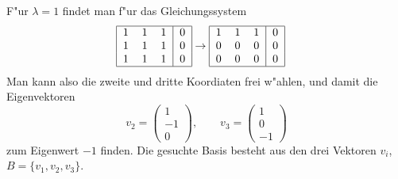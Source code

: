 \begin{loesung}
F"ur $\lambda=1$ findet man f"ur das Gleichungssystem
\begin{align*}
\begin{tabular}{|ccc|c|}
\hline
1&1&1&0\\
1&1&1&0\\
1&1&1&0\\
\hline
\end{tabular}
&\rightarrow
\begin{tabular}{|ccc|c|}
\hline
1&1&1&0\\
0&0&0&0\\
0&0&0&0\\
\hline
\end{tabular}
\end{align*}
Man kann also die zweite und dritte Koordiaten frei w"ahlen, und damit
die Eigenvektoren
\[
v_2=\begin{pmatrix}1\\-1\\0\end{pmatrix},\qquad
v_3=\begin{pmatrix}1\\0\\-1\end{pmatrix}
\]
zum Eigenwert $-1$ finden. Die gesuchte Basis besteht aus den
drei Vektoren $v_i$, $B=\{v_1,v_2,v_3\}$.
\end{loesung}

